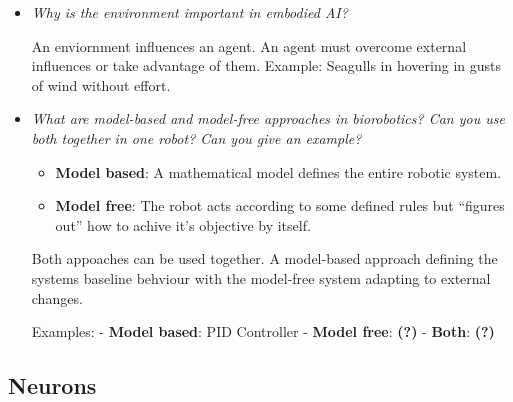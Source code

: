 \documentclass[
    fontsize      = 11pt,
    paper         = a4,
    twoside       = false,
    parskip       = half,
    pagesize      = false,
]{scrartcl}
\providecommand{\tightlist}{%
  \setlength{\itemsep}{0pt}\setlength{\parskip}{0pt}}
\begin{document}
\begin{itemize}
  \textbf{(?)}
\item
  \emph{Why is the environment important in embodied AI?}

  An enviornment influences an agent. An agent must overcome external
  influences or take advantage of them. Example: Seagulls in hovering in
  gusts of wind without effort.
\item
  \emph{What are model-based and model-free approaches in biorobotics?
  Can you use both together in one robot? Can you give an example?}

  \begin{itemize}
  \tightlist
  \item
    \textbf{Model based}: A mathematical model defines the entire
    robotic system.
  \item
    \textbf{Model free}: The robot acts according to some defined rules
    but ``figures out'' how to achive it's objective by itself.
  \end{itemize}

  Both appoaches can be used together. A model-based approach defining
  the systems baseline behviour with the model-free system adapting to
  external changes.

  Examples: - \textbf{Model based}: PID Controller - \textbf{Model
  free}: \textbf{(?)} - \textbf{Both}: \textbf{(?)}
\end{itemize}

\hypertarget{neurons-1}{%
\subsection{Neurons}\label{neurons-1}}
\end{document}
